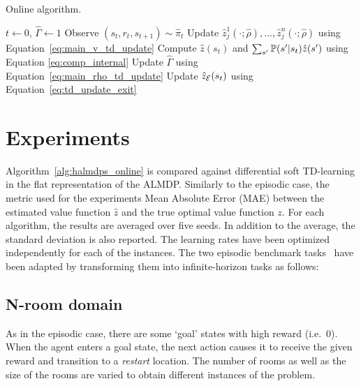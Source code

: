 \begin{algorithm}[!htpb]
  \caption{Online algorithm.}
  \begin{algorithmic}[1]
    \State $t \gets 0$, $\widehat{\Gamma} \gets 1$
    \State Observe $(s_{t}, r_{t}, s_{t+1})\sim\hat\pi_t$
    \State Update $\hat z_j^1(\cdot;\hat\rho),\ldots,\hat z_j^n(\cdot;\hat\rho)$ using Equation~\eqref{eq:main_v_td_update}
    \State Compute $\hat z(s_t)$ and $\sum_{s'}\mathbb{P}(s'|s_t)\hat z(s')$ using Equation \eqref{eq:comp_internal}
    \State Update $\widehat\Gamma$ using Equation~\eqref{eq:main_rho_td_update}
    \State Update $\hat z_{\mathcal{E}}(s_t)$ using Equation~\eqref{eq:td_update_exit}
    \EndIf
    \EndWhile
  \end{algorithmic}
  \label{alg:halmdps_online}
\end{algorithm}

\section{Experiments}

Algorithm~\ref{alg:halmdps_online} is compared against differential soft TD-learning in the flat representation of the ALMDP. Similarly to the episodic case, the metric used for the experiments Mean Absolute Error (MAE) between the estimated value function $\hat z$ and the true optimal value function $z$. For each algorithm, the results are averaged over five seeds. In addition to the average, the standard deviation is also reported. The learning rates have been optimized independently for each of the instances. The two episodic benchmark tasks~\citep{Infante2022} have been adapted by transforming them into infinite-horizon tasks as follows:

  \subsection{N-room domain}
 As in the episodic case, there are some `goal' states with high reward (i.e.~0). When the agent enters a goal state, the next action causes it to receive the given reward and transition to a {\it restart\/} location. The number of rooms as well as the size of the rooms are varied to obtain different instances of the problem.

